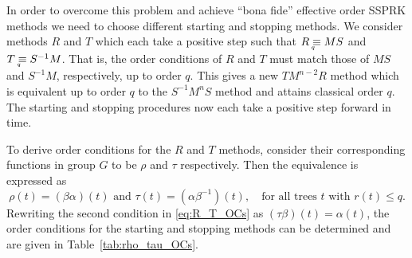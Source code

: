 In order to overcome this problem and achieve ``bona fide'' effective order 
SSPRK methods we need to choose different starting and stopping methods. 
We consider methods $R$ and $T$ which each take a positive step such that 
$R \underaccent{q}{\equiv} MS$ and $T \underaccent{q}{\equiv}S^{-1}M$.
That is, the order conditions of $R$ and $T$ must match those of
$MS$ and $S^{-1}M$, respectively, up to order $q$.
This gives a new $TM^{n-2}R$ method which is equivalent up to order $q$ 
to the $S^{-1}M^nS$ method and attains classical order $q$.
The starting and stopping procedures now each take a positive step forward 
in time.

To derive order conditions for the $R$ and $T$ methods, consider their
corresponding functions in group $G$ to be $\rho$ and $\tau$
respectively.
Then the equivalence is expressed as
\begin{equation} \label{eq:R_T_OCs}
    \rho(t) = (\beta\alpha)(t) \text{ and } \tau(t) = (\alpha\beta^{-1})(t), \quad \text{for all 
    trees $t$ with $r(t) \leq q$.}
\end{equation}
Rewriting the second condition in \eqref{eq:R_T_OCs} as 
$(\tau\beta)(t) = \alpha(t)$, the order conditions for the starting and stopping 
methods can be determined and are given in Table~\ref{tab:rho_tau_OCs}.

